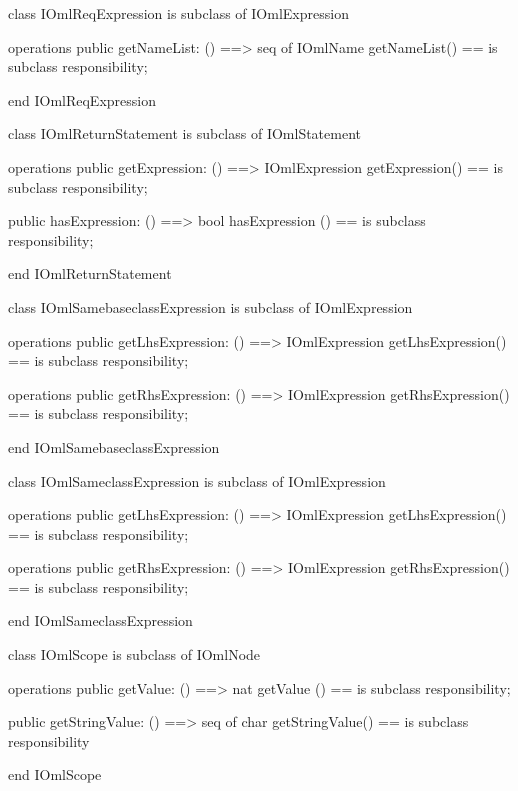 \begin{vdm_al}
class IOmlReqExpression
 is subclass of IOmlExpression

operations
  public getNameList: () ==> seq of IOmlName
  getNameList() == is subclass responsibility;

end IOmlReqExpression
\end{vdm_al}

\begin{vdm_al}
class IOmlReturnStatement
 is subclass of IOmlStatement

operations
  public getExpression: () ==> IOmlExpression
  getExpression() == is subclass responsibility;

  public hasExpression: () ==> bool
  hasExpression () == is subclass responsibility;

end IOmlReturnStatement
\end{vdm_al}

\begin{vdm_al}
class IOmlSamebaseclassExpression
 is subclass of IOmlExpression

operations
  public getLhsExpression: () ==> IOmlExpression
  getLhsExpression() == is subclass responsibility;

operations
  public getRhsExpression: () ==> IOmlExpression
  getRhsExpression() == is subclass responsibility;

end IOmlSamebaseclassExpression
\end{vdm_al}

\begin{vdm_al}
class IOmlSameclassExpression
 is subclass of IOmlExpression

operations
  public getLhsExpression: () ==> IOmlExpression
  getLhsExpression() == is subclass responsibility;

operations
  public getRhsExpression: () ==> IOmlExpression
  getRhsExpression() == is subclass responsibility;

end IOmlSameclassExpression
\end{vdm_al}

\begin{vdm_al}
class IOmlScope
 is subclass of IOmlNode

operations
  public getValue: () ==> nat
  getValue () == is subclass responsibility;

  public getStringValue: () ==> seq of char
  getStringValue() == is subclass responsibility

end IOmlScope
\end{vdm_al}

